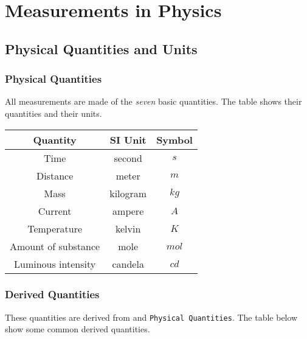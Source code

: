 \documentclass[../notes.tex]{subfiles}
\begin{document}
\section{Measurements in Physics}
\subsection{Physical Quantities and Units}

\subsubsection{Physical Quantities}
All measurements are made of the \textit{seven} basic quantities.
The table shows their quantities and their units.

\begin{center}
	\begin{tabular}{c c c}
		Quantity            & SI Unit  & Symbol \\
		\hline
		Time                & second   & $s$ \\
		Distance            & meter    & $m$ \\
		Mass                & kilogram & $kg$ \\
		Current             & ampere   & $A$ \\
		Temperature         & kelvin   & $K$ \\
		Amount of substance & mole     & $mol$ \\
		Luminous intensity  & candela  & $cd$ \\
	\end{tabular}
\end{center}

\subsubsection{Derived Quantities}
These quantities are derived from and \texttt{Physical Quantities}.
The table below show some common derived quantities.
\end{document}
